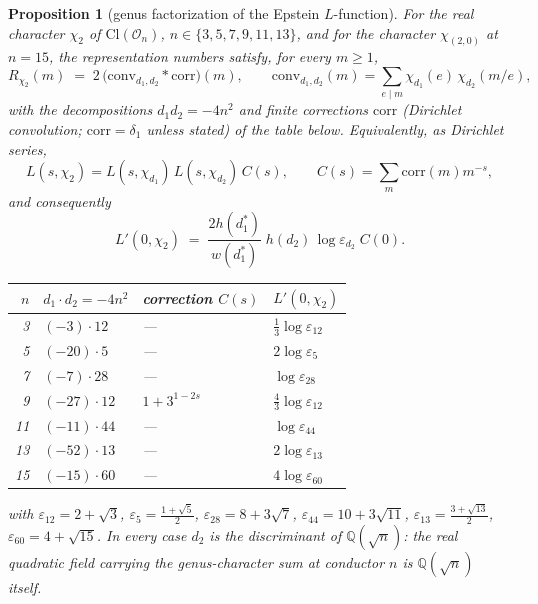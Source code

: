 \documentclass[11pt]{amsart}
\numberwithin{equation}{section}
\theoremstyle{plain}
\newtheorem{proposition}[theorem]{Proposition}
\theoremstyle{definition}
\theoremstyle{remark}
\newcommand{\Q}{\mathbb{Q}}
\newcommand{\Cl}{\mathrm{Cl}}
\newcommand{\Oc}{\mathcal{O}}
\newcommand{\eps}{\varepsilon}
\begin{document}
\begin{proposition}[genus factorization of the Epstein $L$-function]
\label{prop:genus-euc}
For the real character $\chi_2$ of $\Cl(\Oc_n)$, $n \in \{3, 5, 7, 9, 11,
13\}$, and for the character $\chi_{(2,0)}$ at $n = 15$, the
representation numbers satisfy, for every $m \ge 1$,
\begin{equation}\label{eq:conv}
  R_{\chi_2}(m) \;=\; 2\,\bigl(\mathrm{conv}_{d_1,d_2} * \mathrm{corr}\bigr)(m),
  \qquad
  \mathrm{conv}_{d_1,d_2}(m) = \sum_{e \mid m}\chi_{d_1}(e)\,\chi_{d_2}(m/e),
\end{equation}
with the decompositions $d_1d_2 = -4n^2$ and finite corrections
$\mathrm{corr}$ (Dirichlet convolution; $\mathrm{corr} = \delta_1$ unless
stated) of the table below.  Equivalently, as Dirichlet series,
\[
  L(s,\chi_2) = L(s,\chi_{d_1})\,L(s,\chi_{d_2})\,C(s),
  \qquad C(s) = \sum_m\mathrm{corr}(m)m^{-s},
\]
and consequently
\begin{equation}\label{eq:Lprime-genus}
  L'(0,\chi_2) \;=\; \frac{2h(d_1^*)}{w(d_1^*)}\;h(d_2)\,\log\eps_{d_2}\;C(0).
\end{equation}
\begin{center}
\small
\begin{tabular}{@{}rlll@{}}
\toprule
$n$ & $d_1\cdot d_2 = -4n^2$ & correction $C(s)$ & $L'(0,\chi_2)$\\
\midrule
3 & $(-3)\cdot 12$ & --- & $\tfrac13\log\eps_{12}$\\
5 & $(-20)\cdot 5$ & --- & $2\log\eps_5$\\
7 & $(-7)\cdot 28$ & --- & $\log\eps_{28}$\\
9 & $(-27)\cdot 12$ & $1 + 3^{1-2s}$ & $\tfrac43\log\eps_{12}$\\
11 & $(-11)\cdot 44$ & --- & $\log\eps_{44}$\\
13 & $(-52)\cdot 13$ & --- & $2\log\eps_{13}$\\
15 & $(-15)\cdot 60$ & --- & $4\log\eps_{60}$\\
\bottomrule
\end{tabular}
\end{center}
with $\eps_{12} = 2 + \sqrt3$, $\eps_5 = \tfrac{1+\sqrt5}{2}$, $\eps_{28} =
8 + 3\sqrt7$, $\eps_{44} = 10 + 3\sqrt{11}$, $\eps_{13} =
\tfrac{3+\sqrt{13}}2$, $\eps_{60} = 4 + \sqrt{15}$.  \emph{In every case
$d_2$ is the discriminant of $\Q(\sqrt n)$}: the real quadratic field
carrying the genus-character sum at conductor $n$ is $\Q(\sqrt n)$ itself.
\end{proposition}
\end{document}
